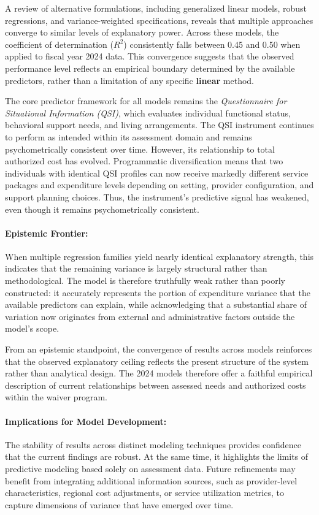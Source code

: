 A review of alternative formulations, including generalized linear models, robust regressions, and variance-weighted specifications, reveals that multiple approaches converge to similar levels of explanatory power.  
Across these models, the coefficient of determination ($R^2$) consistently falls between 0.45 and 0.50 when applied to fiscal year 2024 data.  This convergence suggests that the observed performance level reflects an empirical boundary determined by the available predictors, rather than a limitation of any specific \textbf{linear} method.

The core predictor framework for all models remains the \textit{Questionnaire for Situational Information (QSI)}, which evaluates individual functional status, behavioral support needs, and living arrangements.  The QSI instrument continues to perform as intended within its assessment domain and remains psychometrically consistent over time.  However, its relationship to total authorized cost has evolved.  Programmatic diversification means that two individuals with identical QSI profiles can now receive markedly different service packages and expenditure levels depending on setting, provider configuration, and support planning choices.  Thus, the instrument's predictive signal has weakened, even though it remains psychometrically consistent.

\paragraph{Epistemic Frontier:} 
%
When multiple regression families yield nearly identical explanatory strength, this indicates that the remaining variance is largely structural rather than methodological.  The model is therefore truthfully weak rather than poorly constructed: it accurately represents the portion of expenditure variance that the available predictors can explain, while acknowledging that a substantial share of variation now originates from external and administrative factors outside the model's scope.

From an epistemic standpoint, the convergence of results across models reinforces that the observed explanatory ceiling reflects the present structure of the system rather than analytical design. The 2024 models therefore offer a faithful empirical description of current relationships between assessed needs and authorized costs within the waiver program.


\paragraph{Implications for Model Development:} 
The stability of results across distinct modeling techniques provides confidence that the current findings are robust.  
At the same time, it highlights the limits of predictive modeling based solely on assessment data.  Future refinements may benefit from integrating additional information sources, such as provider-level characteristics, regional cost adjustments, or service utilization metrics, to capture dimensions of variance that have emerged over time.

